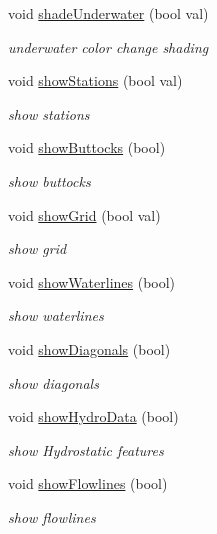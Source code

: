 \begin{DoxyCompactItemize}
void \hyperlink{classShipCAD_1_1Controller_af090412ce033ebbe20c148f3236b8c8e}{shade\+Underwater} (bool val)
\begin{DoxyCompactList}\small\item\em underwater color change shading \end{DoxyCompactList}\item 
void \hyperlink{classShipCAD_1_1Controller_a429e378ef93bf0ec59c7dac048d4b100}{show\+Stations} (bool val)
\begin{DoxyCompactList}\small\item\em show stations \end{DoxyCompactList}\item 
void \hyperlink{classShipCAD_1_1Controller_abf2b642e176da1fd768eaf7952fc80bf}{show\+Buttocks} (bool)
\begin{DoxyCompactList}\small\item\em show buttocks \end{DoxyCompactList}\item 
void \hyperlink{classShipCAD_1_1Controller_ace6b3dde2f577bb95873ece93bcc9a5a}{show\+Grid} (bool val)
\begin{DoxyCompactList}\small\item\em show grid \end{DoxyCompactList}\item 
void \hyperlink{classShipCAD_1_1Controller_a634c01cbbf932acc8115357f3967bd9e}{show\+Waterlines} (bool)
\begin{DoxyCompactList}\small\item\em show waterlines \end{DoxyCompactList}\item 
void \hyperlink{classShipCAD_1_1Controller_aa6729abfadacef4f98c6dbe7d4c1a7e6}{show\+Diagonals} (bool)
\begin{DoxyCompactList}\small\item\em show diagonals \end{DoxyCompactList}\item 
void \hyperlink{classShipCAD_1_1Controller_a29d2c68605ec90055ae0aa27761f2b08}{show\+Hydro\+Data} (bool)
\begin{DoxyCompactList}\small\item\em show Hydrostatic features \end{DoxyCompactList}\item 
void \hyperlink{classShipCAD_1_1Controller_a74187705f2260e641293b2f369757f98}{show\+Flowlines} (bool)
\begin{DoxyCompactList}\small\item\em show flowlines \end{DoxyCompactList}\item 

\end{DoxyCompactItemize}
